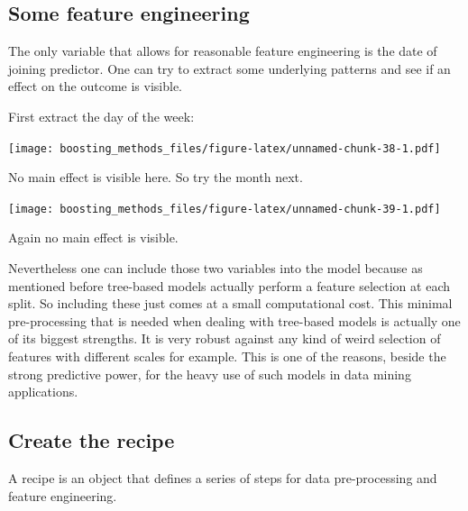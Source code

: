 \documentclass[
]{book}
\begin{document}
\hypertarget{some-feature-engineering}{%
\subsection{Some feature engineering}\label{some-feature-engineering}}

The only variable that allows for reasonable feature engineering is the date of joining predictor. One can try to extract some underlying patterns and see if an effect on the outcome is visible.

First extract the day of the week:

\texttt{[image: boosting\_methods\_files/figure-latex/unnamed-chunk-38-1.pdf]}

No main effect is visible here. So try the month next.

\texttt{[image: boosting\_methods\_files/figure-latex/unnamed-chunk-39-1.pdf]}

Again no main effect is visible.

Nevertheless one can include those two variables into the model because as mentioned before tree-based models actually perform a feature selection at each split. So including these just comes at a small computational cost. This minimal pre-processing that is needed when dealing with tree-based models is actually one of its biggest strengths. It is very robust against any kind of weird selection of features with different scales for example. This is one of the reasons, beside the strong predictive power, for the heavy use of such models in data mining applications.\citep{elements}

\hypertarget{create-the-recipe}{%
\subsection{Create the recipe}\label{create-the-recipe}}

A recipe is an object that defines a series of steps for data pre-processing and feature engineering.
\end{document}
